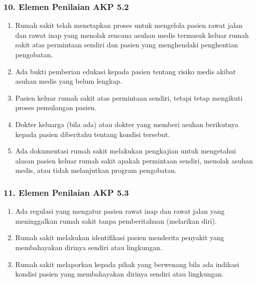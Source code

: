 \documentclass[
]{book}
\providecommand{\tightlist}{%
  \setlength{\itemsep}{0pt}\setlength{\parskip}{0pt}}
\begin{document}
\hypertarget{elemen-penilaian-akp-5.2}{%
\subsubsection*{10. Elemen Penilaian AKP 5.2}\label{elemen-penilaian-akp-5.2}}

\begin{enumerate}
\def\labelenumi{\alph{enumi}.}
\tightlist
\item
  Rumah sakit telah menetapkan proses untuk mengelola pasien rawat jalan dan rawat inap yang menolak rencana asuhan medis termasuk keluar rumah sakit atas permintaan sendiri dan pasien yang menghendaki penghentian pengobatan.
\item
  Ada bukti pemberian edukasi kepada pasien tentang risiko medis akibat asuhan medis yang belum lengkap.
\item
  Pasien keluar rumah sakit atas permintaan sendiri, tetapi tetap mengikuti proses pemulangan pasien.
\item
  Dokter keluarga (bila ada) atau dokter yang memberi asuhan berikutnya kepada pasien diberitahu tentang kondisi tersebut.
\item
  Ada dokumentasi rumah sakit melakukan pengkajian untuk mengetahui alasan pasien keluar rumah sakit apakah permintaan sendiri, menolak asuhan medis, atau tidak melanjutkan program pengobatan.
\end{enumerate}

\hypertarget{elemen-penilaian-akp-5.3}{%
\subsubsection*{11. Elemen Penilaian AKP 5.3}\label{elemen-penilaian-akp-5.3}}

\begin{enumerate}
\def\labelenumi{\alph{enumi}.}
\tightlist
\item
  Ada regulasi yang mengatur pasien rawat inap dan rawat jalan yang meninggalkan rumah sakit tanpa pemberitahuan (melarikan diri).
\item
  Rumah sakit melakukan identifikasi pasien menderita penyakit yang membahayakan dirinya sendiri atau lingkungan.
\item
  Rumah sakit melaporkan kepada pihak yang berwenang bila ada indikasi kondisi pasien yang membahayakan dirinya sendiri atau lingkungan.
\end{enumerate}
\end{document}
